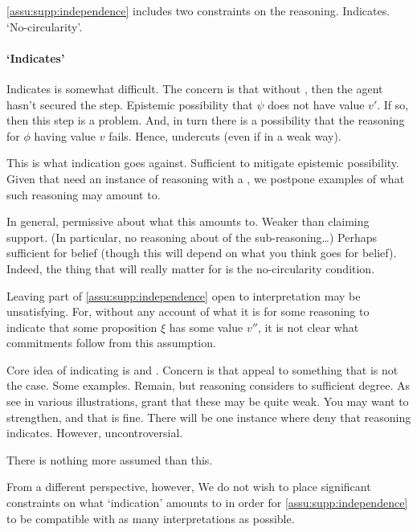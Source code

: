 \begin{note}

  \autoref{assu:supp:independence} includes two constraints on the reasoning.
  Indicates.
  `No-circularity'.
\end{note}

\paragraph{`Indicates'}

\begin{note}
  Indicates is somewhat difficult.
  The concern is that without \requ{}, then the agent hasn't secured the step.
  Epistemic possibility that \(\psi\) does not have value \(v'\).
  If so, then this step is a problem.
  And, in turn there is a possibility that the reasoning for \(\phi\) having value \(v\) fails.
  Hence, undercuts (even if in a weak way).

  This is what indication goes against.
  Sufficient to mitigate epistemic possibility.
  Given that need an instance of reasoning with a \requ{}, we postpone examples of what such reasoning may amount to.

  In general, permissive about what this amounts to.
  Weaker than claiming support.
  (In particular, no reasoning about  of the sub-reasoning\dots)
  Perhaps sufficient for belief (though this will depend on what you think goes for belief).
  Indeed, the thing that will really matter for \nI{} is the no-circularity condition.
\end{note}

\begin{note}
  Leaving part of \autoref{assu:supp:independence} open to interpretation may be unsatisfying.
  For, without any account of what it is for some reasoning to indicate that some proposition \(\xi\) has some value \(v''\), it is not clear what commitments follow from this assumption.

  Core idea of indicating is  and .
  Concern is that appeal to something that is not the case.
  Some examples.
  Remain, but reasoning considers to sufficient degree.
  As see in various illustrations, grant that these may be quite weak.
  You may want to strengthen, and that is fine.
  There will be one instance where deny that reasoning indicates.
  However, uncontroversial.

  There is nothing more assumed than this.
  

  From a different perspective, however, 
  We do not wish to place significant constraints on what `indication' amounts to in order for \autoref{assu:supp:independence} to be compatible with as many interpretations as possible.
\end{note}

